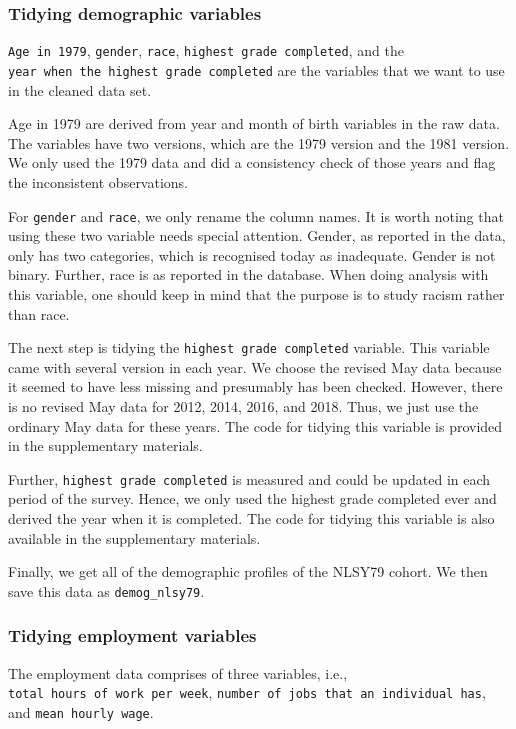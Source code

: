 \documentclass{article}
\begin{document}
\hypertarget{tidydemog}{%
\subsubsection{Tidying demographic variables}\label{tidydemog}}

\texttt{Age\ in\ 1979}, \texttt{gender}, \texttt{race}, \texttt{highest\ grade\ completed}, and the \texttt{year\ when\ the\ highest\ grade\ completed} are the variables that we want to use in the cleaned data set.

Age in 1979 are derived from year and month of birth variables in the raw data. The variables have two versions, which are the 1979 version and the 1981 version. We only used the 1979 data and did a consistency check of those years and flag the inconsistent observations.

For \texttt{gender} and \texttt{race}, we only rename the column names. It is worth noting that using these two variable needs special attention. Gender, as reported in the data, only has two categories, which is recognised today as inadequate. Gender is not binary. Further, race is as reported in the database. When doing analysis with this variable, one should keep in mind that the purpose is to study racism rather than race.

The next step is tidying the \texttt{highest\ grade\ completed} variable. This variable came with several version in each year. We choose the revised May data because it seemed to have less missing and presumably has been checked. However, there is no revised May data for 2012, 2014, 2016, and 2018. Thus, we just use the ordinary May data for these years. The code for tidying this variable is provided in the supplementary materials.

Further, \texttt{highest\ grade\ completed} is measured and could be updated in each period of the survey. Hence, we only used the highest grade completed ever and derived the year when it is completed. The code for tidying this variable is also available in the supplementary materials.

Finally, we get all of the demographic profiles of the NLSY79 cohort. We then save this data as \texttt{demog\_nlsy79}.

\hypertarget{tidyemp}{%
\subsubsection{Tidying employment variables}\label{tidyemp}}

The employment data comprises of three variables, i.e., \texttt{total\ hours\ of\ work\ per\ week}, \texttt{number\ of\ jobs\ that\ an\ individual\ has}, and \texttt{mean\ hourly\ wage}.
\end{document}
